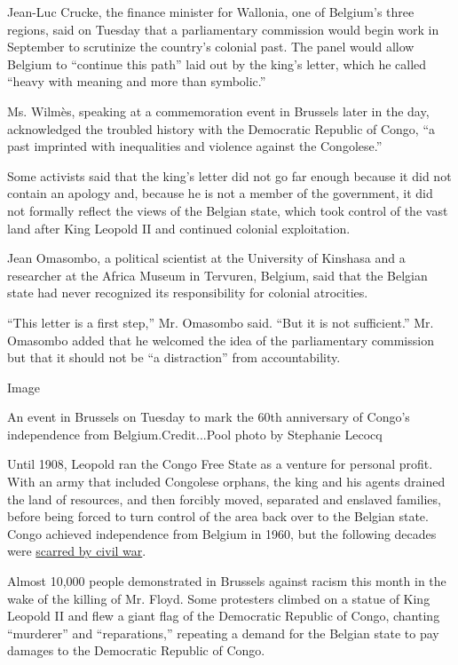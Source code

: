 Jean-Luc Crucke, the finance minister for Wallonia, one of Belgium's
three regions, said on Tuesday that a parliamentary commission would
begin work in September to scrutinize the country's colonial past. The
panel would allow Belgium to ``continue this path'' laid out by the
king's letter, which he called ``heavy with meaning and more than
symbolic.''

Ms. Wilmès, speaking at a commemoration event in Brussels later in the
day, acknowledged the troubled history with the Democratic Republic of
Congo, ``a past imprinted with inequalities and violence against the
Congolese.''

Some activists said that the king's letter did not go far enough because
it did not contain an apology and, because he is not a member of the
government, it did not formally reflect the views of the Belgian state,
which took control of the vast land after King Leopold II and continued
colonial exploitation.

Jean Omasombo, a political scientist at the University of Kinshasa and a
researcher at the Africa Museum in Tervuren, Belgium, said that the
Belgian state had never recognized its responsibility for colonial
atrocities.

``This letter is a first step,'' Mr. Omasombo said. ``But it is not
sufficient.'' Mr. Omasombo added that he welcomed the idea of the
parliamentary commission but that it should not be ``a distraction''
from accountability.

Image

An event in Brussels on Tuesday to mark the 60th anniversary of Congo's
independence from Belgium.Credit...Pool photo by Stephanie Lecocq

Until 1908, Leopold ran the Congo Free State as a venture for personal
profit. With an army that included Congolese orphans, the king and his
agents drained the land of resources, and then forcibly moved, separated
and enslaved families, before being forced to turn control of the area
back over to the Belgian state. Congo achieved independence from Belgium
in 1960, but the following decades were
\href{https://www.nytimes.com/2005/07/03/magazine/the-congo-case.html}{scarred
by civil war}.

Almost 10,000 people demonstrated in Brussels against racism this month
in the wake of the killing of Mr. Floyd. Some protesters climbed on a
statue of King Leopold II and flew a giant flag of the Democratic
Republic of Congo, chanting ``murderer'' and ``reparations,'' repeating
a demand for the Belgian state to pay damages to the Democratic Republic
of Congo.

